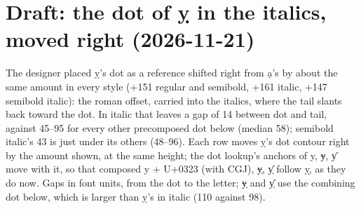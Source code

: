 \documentclass[10pt]{article}
\begin{document}
\section*{Draft: the dot of ỵ in the italics, moved right (2026-11-21)}
The designer placed ỵ's dot as a reference shifted right from ạ's by about the same amount in every style (+151 regular and semibold, +161 italic, +147 semibold italic): the roman offset, carried into the italics, where the tail slants back toward the dot.
In italic that leaves a gap of 14 between dot and tail, against 45--95 for every other precomposed dot below (median 58); semibold italic's 43 is just under its others (48--96).
Each row moves ỵ's dot contour right by the amount shown, at the same height; the dot lookup's anchors of y, ɏ, ƴ move with it, so that composed y + U+0323 (with CGJ), ɏ̣, ƴ̣ follow ỵ, as they do now.
Gaps in font units, from the dot to the letter; ɏ̣ and ƴ̣ use the combining dot below, which is larger than ỵ's in italic (110 against 98).
\end{document}
